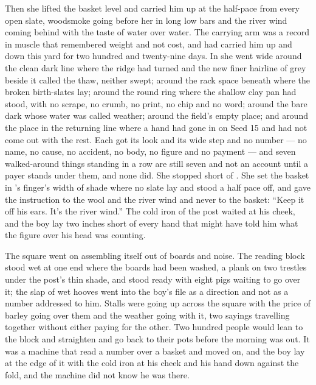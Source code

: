 Then she lifted the basket level and carried him up  at the half-pace from every open slate, woodsmoke going before her in long low bars and the river wind coming behind with the taste of water over water. The carrying arm was a record in muscle that remembered weight and not cost, and had carried him up and down this yard for two hundred and twenty-nine days. In  she went wide around the clean dark line where the  ridge had turned and the new finer hairline of grey beside it called the thaw, neither swept; around the rack space beneath  where the broken birth-slates lay; around the round ring where the shallow clay pan had stood, with no scrape, no crumb, no print, no chip and no word; around the bare dark  whose water was called weather; around the field's empty place; and around the place in the returning line where a hand had gone in on Seed 15 and had not come out with the rest. Each got its look and its wide step and no number --- no name, no cause, no accident, no body, no figure and no payment --- and seven walked-around things standing in a row are still seven and not an account until a payer stands under them, and none did. She stopped short of . She set the basket in 's finger's width of shade where no slate lay and stood a half pace off, and gave the instruction to the wool and the river wind and never to the basket: “Keep it off his ears. It's the river wind.” The cold iron of the post waited at his cheek, and the boy lay two inches short of every hand that might have told him what the figure over his head was counting.

\scenebreak

The square went on assembling itself out of boards and noise. The reading block stood wet at one end where the boards had been washed, a plank on two trestles under the post's thin shade, and  stood ready with eight pigs waiting to go over it; the slap of wet hooves went into the boy's file as a direction and not as a number addressed to him. Stalls were going up across the square with the price of barley going over them and the weather going with it, two sayings travelling together without either paying for the other. Two hundred people would lean to the block and straighten and go back to their pots before the morning was out. It was a machine that read a number over a basket and moved on, and the boy lay at the edge of it with the cold iron at his cheek and his hand down against the fold, and the machine did not know he was there.

